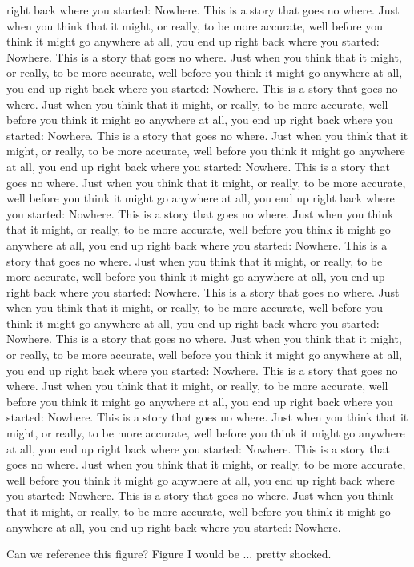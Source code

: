 \documentclass{amsart}
\begin{document}
{right back where you started: Nowhere.  This is a story that goes no where. Just when you think that it might, or really, to be more accurate, well before you think it might go anywhere at all, you end up right back where you started: Nowhere.  This is a story that goes no where. Just when you think that it might, or really, to be more accurate, well before you think it might go anywhere at all, you end up right back where you started: Nowhere.  This is a story that goes no where. Just when you think that it might, or really, to be more accurate, well before you think it might go anywhere at all, you end up right back where you started: Nowhere.  This is a story that goes no where. Just when you think that it might, or really, to be more accurate, well before you think it might go anywhere at all, you end up right back where you started: Nowhere.  This is a story that goes no where. Just when you think that it might, or really, to be more accurate, well before you think it might go anywhere at all, you end up right back where you started: Nowhere.  This is a story that goes no where. Just when you think that it might, or really, to be more accurate, well before you think it might go anywhere at all, you end up right back where you started: Nowhere.  This is a story that goes no where. Just when you think that it might, or really, to be more accurate, well before you think it might go anywhere at all, you end up right back where you started: Nowhere.  This is a story that goes no where. Just when you think that it might, or really, to be more accurate, well before you think it might go anywhere at all, you end up right back where you started: Nowhere.  This is a story that goes no where. Just when you think that it might, or really, to be more accurate, well before you think it might go anywhere at all, you end up right back where you started: Nowhere.  This is a story that goes no where. Just when you think that it might, or really, to be more accurate, well before you think it might go anywhere at all, you end up right back where you started: Nowhere.  This is a story that goes no where. Just when you think that it might, or really, to be more accurate, well before you think it might go anywhere at all, you end up right back where you started: Nowhere.  This is a story that goes no where. Just when you think that it might, or really, to be more accurate, well before you think it might go anywhere at all, you end up right back where you started: Nowhere.  This is a story that goes no where. Just when you think that it might, or really, to be more accurate, well before you think it might go anywhere at all, you end up right back where you started: Nowhere. 

        Can we reference this figure? Figure I would be ... pretty shocked.}
\end{document}
